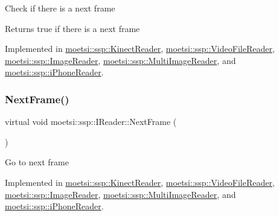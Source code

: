 Check if there is a next frame \begin{DoxyReturn}{Returns}
true if there is a next frame 
\end{DoxyReturn}


Implemented in \hyperlink{classmoetsi_1_1ssp_1_1KinectReader_a08934b6eff437142e482bb21780ca171}{moetsi\+::ssp\+::\+Kinect\+Reader}, \hyperlink{classmoetsi_1_1ssp_1_1VideoFileReader_ab5733b56b6d6dd7596eac9d914481c7e}{moetsi\+::ssp\+::\+Video\+File\+Reader}, \hyperlink{classmoetsi_1_1ssp_1_1ImageReader_ad8e87720ca0ec97de501f1070119b28d}{moetsi\+::ssp\+::\+Image\+Reader}, \hyperlink{classmoetsi_1_1ssp_1_1MultiImageReader_a04240c98d28d8949fca4ecdcb04f04f5}{moetsi\+::ssp\+::\+Multi\+Image\+Reader}, and \hyperlink{classmoetsi_1_1ssp_1_1iPhoneReader_a35ca55a03a9fb7b559f9381b11f53bfe}{moetsi\+::ssp\+::i\+Phone\+Reader}.

\mbox{\label{classmoetsi_1_1ssp_1_1IReader_a49e82a786cca55248e27e7fac8f97a17}} 
\subsubsection{\texorpdfstring{Next\+Frame()}{NextFrame()}}
{\footnotesize\ttfamily virtual void moetsi\+::ssp\+::\+I\+Reader\+::\+Next\+Frame (\begin{DoxyParamCaption}{ }\end{DoxyParamCaption})\hspace{0.3cm}{\ttfamily [pure virtual]}}

Go to next frame 

Implemented in \hyperlink{classmoetsi_1_1ssp_1_1KinectReader_a8495eb28b3893281c1d4bbd5ba9f9739}{moetsi\+::ssp\+::\+Kinect\+Reader}, \hyperlink{classmoetsi_1_1ssp_1_1VideoFileReader_afdaf5606fd0cfcc2e1b5b7c0fb271ebf}{moetsi\+::ssp\+::\+Video\+File\+Reader}, \hyperlink{classmoetsi_1_1ssp_1_1ImageReader_a9b0a43f9a4fff4d0b8448e8ba168ad05}{moetsi\+::ssp\+::\+Image\+Reader}, \hyperlink{classmoetsi_1_1ssp_1_1MultiImageReader_a472e2b97ce7a1c2485abd14c276bb8fe}{moetsi\+::ssp\+::\+Multi\+Image\+Reader}, and \hyperlink{classmoetsi_1_1ssp_1_1iPhoneReader_abba4479843de3e7ab42a3116b9fa94c9}{moetsi\+::ssp\+::i\+Phone\+Reader}.

\mbox{\label{classmoetsi_1_1ssp_1_1IReader_ad6e2ef78fc2466884aa877ecef54889d}} 
